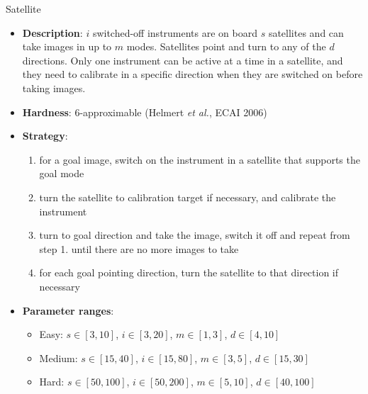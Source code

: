 \documentclass[aspectratio=169,xcolor=dvipsnames]{beamer}
\begin{document}
\begin{frame}{Satellite}

    \begin{itemize}
        \item \textbf{Description}: $i$ switched-off instruments are on board $s$ satellites and can take images in up to $m$ modes. Satellites point and turn to any of the $d$ directions. Only one instrument can be active at a time in a satellite, and they need to calibrate in a specific direction when they are switched on before taking images.
        \item \textbf{Hardness}: $6$-approximable (Helmert \textit{et al.}, ECAI 2006)
        \item \textbf{Strategy}:
        \begin{enumerate}
            \item for a goal image, switch on the instrument in a satellite that supports the goal mode
            \item turn the satellite to calibration target if necessary, and calibrate the instrument
            \item turn to goal direction and take the image, switch it off and repeat from step 1. until there are no more images to take
            \item for each goal pointing direction, turn the satellite to that direction if necessary
        \end{enumerate}
        \item \textbf{Parameter ranges}:
        \begin{itemize}
            \item Easy: $s\in[3, 10]$, $i\in[3,20]$, $m\in[1, 3]$, $d\in[4, 10]$
            \item Medium: $s\in[15, 40]$, $i\in[15,80]$, $m\in[3, 5]$, $d\in[15, 30]$
            \item Hard: $s\in[50, 100]$, $i\in[50,200]$, $m\in[5, 10]$, $d\in[40, 100]$
        \end{itemize}
    \end{itemize}

\end{frame}
\end{document}

